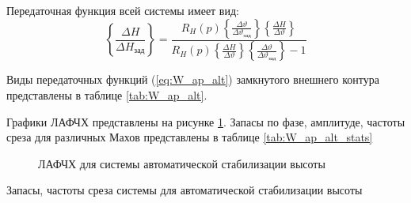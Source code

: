 Передаточная функция всей системы имеет вид: 
\begin{equation}
    \left\{ \frac{\Delta H}{\Delta H_{зад}} \right\}  = \frac{R_H(p) \left\{ \frac{\Delta \vartheta}{\Delta \vartheta_{зад}} \right\} \left\{ \frac{\Delta H }{\Delta \vartheta} \right\}}{R_H(p) \left\{ \frac{\Delta H }{\Delta \vartheta} \right\} \left\{ \frac{\Delta \vartheta}{\Delta \vartheta_{зад}} \right\}  - 1}
    \label{eq:W_ap_alt}
\end{equation}

Виды передаточных функций (\ref{eq:W_ap_alt}) замкнутого внешнего контура
представлены в таблице \ref{tab:W_ap_alt}.

\begin{table}[H]
    \centering
    \caption{Передаточные функции замкнутого внешнего контура при различных скоростных напорах}
    \label{tab:W_ap_alt}
\end{table}

Графики ЛАФЧХ представлены на рисунке \ref{fig:W_ap_alt}. Запасы по фазе,
амплитуде, частоты среза для различных Махов представлены в таблице
\ref{tab:W_ap_alt_stats}

\begin{figure}[H]
    \centering
    
    \caption{ЛАФЧХ для системы автоматической стабилизации высоты}
    \label{fig:W_ap_alt}
\end{figure}
\begin{table}[H]
    \centering
    \caption{Запасы, частоты среза системы для автоматической стабилизации высоты}
    \label{tab:W_ap_alt_stats}
    
\end{table}

